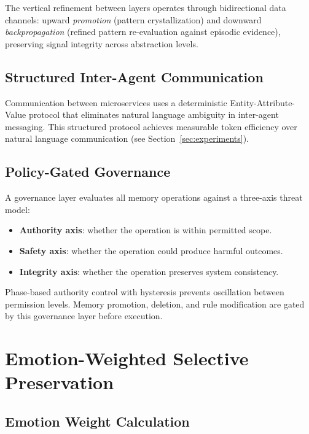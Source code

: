\documentclass[11pt,a4paper]{article}
\begin{document}
The vertical refinement between layers operates through bidirectional data channels: upward \emph{promotion} (pattern crystallization) and downward \emph{backpropagation} (refined pattern re-evaluation against episodic evidence), preserving signal integrity across abstraction levels.

\subsection{Structured Inter-Agent Communication}

Communication between microservices uses a deterministic Entity-Attribute-Value protocol that eliminates natural language ambiguity in inter-agent messaging. This structured protocol achieves measurable token efficiency over natural language communication (see Section~\ref{sec:experiments}).

\subsection{Policy-Gated Governance}

A governance layer evaluates all memory operations against a three-axis threat model:
\begin{itemize}[itemsep=2pt]
  \item \textbf{Authority axis}: whether the operation is within permitted scope.
  \item \textbf{Safety axis}: whether the operation could produce harmful outcomes.
  \item \textbf{Integrity axis}: whether the operation preserves system consistency.
\end{itemize}

Phase-based authority control with hysteresis prevents oscillation between permission levels. Memory promotion, deletion, and rule modification are gated by this governance layer before execution.

\section{Emotion-Weighted Selective Preservation}

\subsection{Emotion Weight Calculation}
\end{document}
